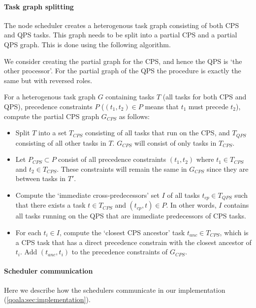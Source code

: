 \paragraph{Task graph splitting}
\label{qoala:sec:app:task_graph_splitting}
The node scheduler creates a heterogenous task graph consisting of both CPS and QPS tasks.
This graph needs to be split into a partial CPS and a partial QPS graph.
This is done using the following algorithm.

We consider creating the partial graph for the CPS, and hence the QPS is `the other processor'.
For the partial graph of the QPS the procedure is exactly the same but with reversed roles.

For a heterogenous task graph $G$ containing tasks $T$ (all tasks for both CPS and QPS), precedence constraints $P$ ($(t_1, t_2) \in P$ means that $t_1$ must precede $t_2$), compute the partial CPS graph $G_{CPS}$ as follows:

\begin{itemize}
    \item Split $T$ into a set $T_{CPS}$ consisting of all tasks that run on the CPS, and $T_{QPS}$ consisting of all other tasks in $T$. $G_{CPS}$ will consist of only tasks in $T_{CPS}$.
    \item Let $P_{CPS} \subset P$ consist of all precedence constraints $(t_1, t_2)$ where $t_1 \in T_{CPS}$ and $t_2 \in T_{CPS}$.
    These constraints will remain the same in $G_{CPS}$ since they are between tasks in $T'$.
    \item Compute the `immediate cross-predecessors' set $I$ of all tasks $t_{cp} \in T_{QPS}$ such that there exists a task $t \in T_{CPS}$ and $(t_{cp}, t) \in P$.
    In other words, $I$ contains all tasks running on the QPS that are immediate predecessors of CPS tasks.
    \item For each $t_i \in I$, compute the `closest CPS ancestor' task $t_{anc} \in T_{CPS}$, which is a CPS task that has a direct precedence constrain with the closest ancestor of $t_i$.
    Add $(t_{anc}, t_i)$ to the precedence constraints of $G_{CPS}$.
\end{itemize}

\paragraph{Scheduler communication}
Here we describe how the schedulers communicate in our implementation (\cref{qoala:sec:implementation}).


